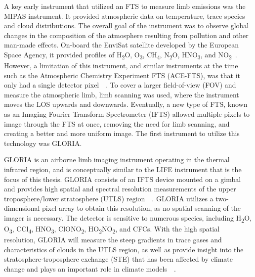 A key early instrument that utilized an FTS to measure limb emissions was the MIPAS instrument. It provided atmospheric data on temperature, trace species and cloud distributions. The overall goal of the instrument was to observe global changes in the composition of the atmosphere resulting from pollution and other man-made effects. On-board the EnviSat satellite developed by the European Space Agency, it provided profiles of H\textsubscript{2}O, O\textsubscript{3}, CH\textsubscript{4}, N\textsubscript{2}O, HNO\textsubscript{3}, and NO\textsubscript{2}~\citep{MIPAS_instrument}. However, a limitation of this instrument, and similar instruments at the time such as the Atmospheric Chemistry Experiment FTS (ACE-FTS), was that it only had a single detector pixel~\citep{SPARC}~\citep{ACE_conference}. To cover a larger field-of-view (FOV) and measure the atmospheric limb, limb scanning was used, where the instrument moves the LOS upwards and downwards. Eventually, a new type of FTS, known as an Imaging Fourier Transform Spectrometer (IFTS) allowed multiple pixels to image through the FTS at once, removing the need for limb scanning, and creating a better and more uniform image. The first instrument to utilize this technology was GLORIA.

GLORIA is an airborne limb imaging instrument operating in the thermal infrared region, and is conceptually similar to the LIFE instrument that is the focus of this thesis. GLORIA consists of an IFTS device mounted on a gimbal and provides high spatial and spectral resolution measurements of the upper troposphere/lower stratosphere (UTLS) region~\citep{GLORIA_concept}~\citep{GLORIA_PhD}. GLORIA utilizes a two-dimensional pixel array to obtain this resolution, as no spatial scanning of the imager is necessary. The detector is sensitive to numerous species, including H\textsubscript{2}O, O\textsubscript{3}, CCl\textsubscript{4}, HNO\textsubscript{3}, ClONO\textsubscript{2}, HO\textsubscript{2}NO\textsubscript{2}, and CFCs. With the high spatial resolution, GLORIA will measure the steep gradients in trace gases and characteristics of clouds in the UTLS region, as well as provide insight into the stratosphere-troposphere exchange (STE) that has been affected by climate change and plays an important role in climate models~\citep{GLORIA_PhD}~\citep{GLORIA_objectives}.

